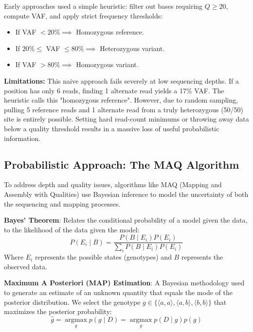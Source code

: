 Early approaches used a simple heuristic: filter out bases requiring $Q \ge 20$, compute VAF, and apply strict frequency thresholds:
\begin{itemize}
    \item If VAF $< 20\% \implies$ Homozygous reference.
    \item If $20\% \le$ VAF $\le 80\% \implies$ Heterozygous variant.
    \item If VAF $> 80\% \implies$ Homozygous variant.
\end{itemize}

\sta \textbf{Limitations:} This naive approach fails severely at low sequencing depths. If a position has only 6 reads, finding 1 alternate read yields a 17\% VAF. The heuristic calls this "homozygous reference". However, due to random sampling, pulling 5 reference reads and 1 alternate read from a truly heterozygous (50/50) site is entirely possible. Setting hard read-count minimums or throwing away data below a quality threshold results in a massive loss of useful probabilistic information.

\subsection{Probabilistic Approach: The MAQ Algorithm}

To address depth and quality issues, algorithms like MAQ (Mapping and Assembly with Qualities) use Bayesian inference to model the uncertainty of both the sequencing and mapping processes.

\begin{important}
  \textbf{Bayes' Theorem}: Relates the conditional probability of a model given the data, to the likelihood of the data given the model:
  \[ P(E_i \mid B) = \frac{P(B \mid E_i) P(E_i)}{\sum_i P(B \mid E_i) P(E_i)} \]
  Where $E_i$ represents the possible states (genotypes) and $B$ represents the observed data.
\end{important}

\begin{important}
  \textbf{Maximum A Posteriori (MAP) Estimation}: A Bayesian methodology used to generate an estimate of an unknown quantity that equals the mode of the posterior distribution. We select the genotype $g \in \{ \langle a,a \rangle, \langle a,b \rangle, \langle b,b \rangle \}$ that maximizes the posterior probability:
  \begin{equation}
      \hat{g} = \underset{g}{\operatorname{argmax}} p(g \mid D) = \underset{g}{\operatorname{argmax}} p(D \mid g) p(g)
  \end{equation}
\end{important}

